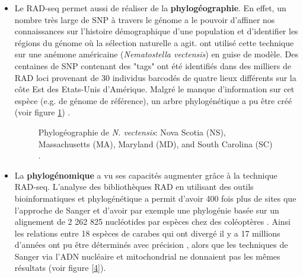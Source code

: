 \documentclass[a4paper,11pt,twoside]{report}
\begin{document}
\begin{itemize}
\item Le RAD-seq permet aussi de réaliser de la \textbf{phylogéographie}. En effet, un nombre très large de SNP à travers le génome a le pouvoir d'affiner nos connaissances sur l'histoire démographique d'une population et d'identifier les régions du génome où la sélection naturelle a agit. \citet{Reitzel2013aa} ont utilisé cette technique sur une anémone américaine (\textit{Nematostella vectensis}) en guise de modèle. Des centaines de SNP contenant des "tags" ont été identifiés dans des milliers de RAD loci provenant de 30 individus barcodés de quatre lieux différents sur la côte Est des Etats-Unis d'Amérique. Malgré le manque d'information sur cet espèce (e.g. de génome de référence), un arbre phylogénétique a pu être créé (voir figure \ref{3}) \citep{Reitzel2013aa}.

\begin{figure}[!ht]
\caption{Phylogéographie de \textit{N. vectensis}: Nova Scotia (NS), Massachusetts (MA), Maryland (MD), and South Carolina (SC) \citep{Reitzel2013aa}\label{3}.}
\end{figure}

\item La \textbf{phylogénomique} a vu ses capacités augmenter grâce à la technique RAD-seq. L'analyse des bibliothèques RAD en utilisant des outils bioinformatiques et phylogénétique a permit d'avoir 400 fois plus de sites que l'approche de Sanger et d'avoir par exemple une phylogénie basée sur un alignement de 2 262 825 nucléotides par espèces chez des coléoptères \citep{cruaud2014empirical}. Ainsi les relations entre 18 espèces de carabes qui ont divergé il y a 17 millions d'années ont pu être déterminés avec précision \citep{cruaud2014empirical}, alors que les techniques de Sanger via l'ADN nucléaire et mitochondrial ne donnaient pas les mêmes résultats (voir figure \ref{4}). 


\end{itemize}
\end{document}
